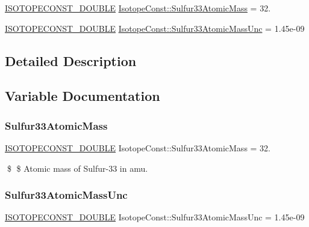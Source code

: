 \begin{DoxyCompactItemize}
\item 
\mbox{\hyperlink{group___isotope_const-_macros_ga8f45a7272ce02c0b4c65c44636ed719a}{I\+S\+O\+T\+O\+P\+E\+C\+O\+N\+S\+T\+\_\+\+D\+O\+U\+B\+LE}} \mbox{\hyperlink{group___isotope_const-_sulfur-_s33_ga860de4a575362f12d582acb16ac62267}{Isotope\+Const\+::\+Sulfur33\+Atomic\+Mass}} = 32.
\item 
\mbox{\hyperlink{group___isotope_const-_macros_ga8f45a7272ce02c0b4c65c44636ed719a}{I\+S\+O\+T\+O\+P\+E\+C\+O\+N\+S\+T\+\_\+\+D\+O\+U\+B\+LE}} \mbox{\hyperlink{group___isotope_const-_sulfur-_s33_ga9aeb742cea7114a728eecf7507f4582a}{Isotope\+Const\+::\+Sulfur33\+Atomic\+Mass\+Unc}} = 1.\+45e-\/09
\end{DoxyCompactItemize}


\subsection{Detailed Description}


\subsection{Variable Documentation}
\mbox{\label{group___isotope_const-_sulfur-_s33_ga860de4a575362f12d582acb16ac62267}} 
\subsubsection{\texorpdfstring{Sulfur33\+Atomic\+Mass}{Sulfur33AtomicMass}}
{\footnotesize\ttfamily \mbox{\hyperlink{group___isotope_const-_macros_ga8f45a7272ce02c0b4c65c44636ed719a}{I\+S\+O\+T\+O\+P\+E\+C\+O\+N\+S\+T\+\_\+\+D\+O\+U\+B\+LE}} Isotope\+Const\+::\+Sulfur33\+Atomic\+Mass = 32.}

\$ \$ Atomic mass of Sulfur-\/33 in amu. \mbox{\label{group___isotope_const-_sulfur-_s33_ga9aeb742cea7114a728eecf7507f4582a}} 
\subsubsection{\texorpdfstring{Sulfur33\+Atomic\+Mass\+Unc}{Sulfur33AtomicMassUnc}}
{\footnotesize\ttfamily \mbox{\hyperlink{group___isotope_const-_macros_ga8f45a7272ce02c0b4c65c44636ed719a}{I\+S\+O\+T\+O\+P\+E\+C\+O\+N\+S\+T\+\_\+\+D\+O\+U\+B\+LE}} Isotope\+Const\+::\+Sulfur33\+Atomic\+Mass\+Unc = 1.\+45e-\/09}

